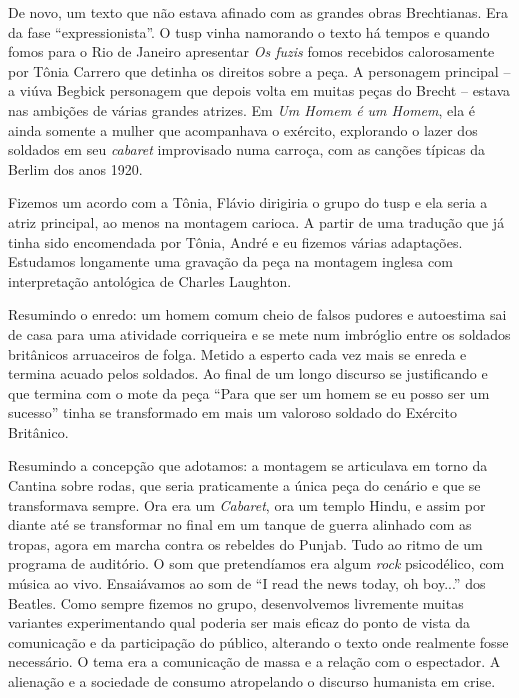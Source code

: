 De novo, um texto que não estava afinado com as grandes obras
Brechtianas. Era da fase “expressionista”. O {\sc tusp} vinha namorando o
texto há tempos e quando fomos para o Rio de Janeiro apresentar {\it Os
fuzis} fomos recebidos calorosamente por Tônia Carrero que detinha os
direitos sobre a peça. A personagem principal -- a viúva Begbick
personagem que depois volta em muitas peças do Brecht -- estava nas
ambições de várias grandes atrizes. Em {\it Um Homem é um Homem}, ela é
ainda somente a mulher que acompanhava o exército, explorando o lazer
dos soldados em seu {\it cabaret} improvisado numa carroça, com as
canções típicas da Berlim dos anos 1920.

Fizemos um acordo com a Tônia, Flávio dirigiria o grupo do {\sc tusp} e ela
seria a atriz principal, ao menos na montagem carioca. A partir de uma
tradução que já tinha sido encomendada por Tônia, André e eu fizemos
várias adaptações. Estudamos longamente uma gravação da peça na montagem
inglesa com interpretação antológica de Charles Laughton.

Resumindo o enredo: um homem comum cheio de falsos pudores e autoestima
sai de casa para uma atividade corriqueira e se mete num imbróglio entre
os soldados britânicos arruaceiros de folga. Metido a esperto cada vez
mais se enreda e termina acuado pelos soldados. Ao final de um longo
discurso se justificando e que termina com o mote da peça “Para que ser
um homem se eu posso ser um sucesso” tinha se transformado em mais um
valoroso soldado do Exército Britânico.

Resumindo a concepção que adotamos: a montagem se articulava em torno da
Cantina sobre rodas, que seria praticamente a única peça do cenário e
que se transformava sempre. Ora era um {\it Cabaret}, ora um templo
Hindu, e assim por diante até se transformar no final em um tanque de
guerra alinhado com as tropas, agora em marcha contra os rebeldes do
Punjab. Tudo ao ritmo de um programa de auditório. O som que
pretendíamos era algum {\it rock} psicodélico, com música ao vivo.
Ensaiávamos ao som de “I read the news today, oh boy...” dos Beatles.
Como sempre fizemos no grupo, desenvolvemos livremente muitas variantes
experimentando qual poderia ser mais eficaz do ponto de vista da
comunicação e da participação do público, alterando o texto onde
realmente fosse necessário. O tema era a comunicação de massa e a
relação com o espectador. A alienação e a sociedade de consumo
atropelando o discurso humanista em crise.

\subject{Repressão política e fim do {\cap tusp}}

